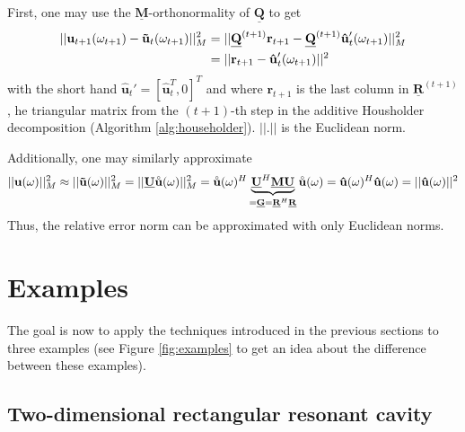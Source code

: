 \documentclass[11pt, a4paper]{article}
\begin{document}
First, one may use the $\mathbf{\underline{M}}$-orthonormality of $\mathbf{\underline{Q}}$
to get
\begin{align}
    ||\mathbf{u}_{t+1}(\omega_{t+1}) - \mathbf{\tilde{u}}_{t}(\omega_{t+1})||_M^2
    &= ||\mathbf{\underline{Q}}^{(t+1)} \mathbf{r}_{t+1} - \mathbf{\underline{Q}}^{(t+1)}\mathbf{\hat{u}}_{t}'(\omega_{t+1})||_M^2 \notag \\
    &= ||\mathbf{r}_{t+1} - \mathbf{\hat{u}}_{t}'(\omega_{t+1})||^2
\end{align}
with the short hand $\mathbf{\hat{u}}_{t}' = [\mathbf{\hat{u}}_{t}^T, 0]^T$
and where $\mathbf{r}_{t+1}$ is the last column in $\mathbf{\underline{R}}^{(t+1)}$,
he triangular matrix from the $(t+1)$-th step in the additive Housholder decomposition
(Algorithm \ref{alg:householder}). $||.||$ is the Euclidean norm.

Additionally, one may similarly approximate
\begin{equation}
    ||\mathbf{u}(\omega)||_M^2 \approx ||\mathbf{\tilde{u}}(\omega)||_M^2
    = ||\mathbf{\underline{U}} \accentset{\circ}{\mathbf{u}}(\omega)||_M^2
    = \accentset{\circ}{\mathbf{u}}(\omega)^H \underbrace{\mathbf{\underline{U}}^H \mathbf{\underline{M}} \mathbf{\underline{U}}}_{= \mathbf{\underline{G}} = \mathbf{\underline{R}}^H \mathbf{\underline{R}}} \accentset{\circ}{\mathbf{u}}(\omega)
    = \mathbf{\hat{u}}(\omega)^H \mathbf{\hat{u}}(\omega)
    = ||\mathbf{\hat{u}}(\omega)||^2
\end{equation}
Thus, the relative error norm can be approximated with only Euclidean norms.

\newpage
\section{Examples}
\label{sec:examples}

The goal is now to apply the techniques introduced in the previous sections
to three examples (see Figure \ref{fig:examples} to get an idea about the
difference between these examples).

\subsection{Two-dimensional rectangular resonant cavity}
\label{subsec:examples-rectangularcavity}
\end{document}
